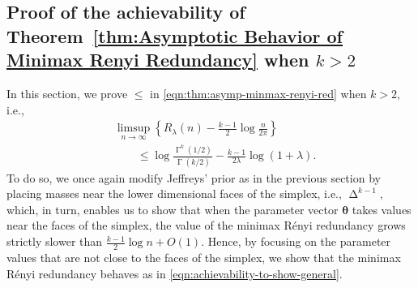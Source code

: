 \documentclass[journal, 10pt]{IEEEtran}
\theoremstyle{plain}
\theoremstyle{plain}
\theoremstyle{plain}
\theoremstyle{plain}
\newcommand{\boldtheta}{\mathbold{\theta}}
\newcommand{\opGamma}{\operatorname{\Gamma}}
\newcommand{\simplex}{\operatorname{\Delta}}
\begin{document}
\subsection{Proof of the achievability of Theorem~\ref{thm:Asymptotic Behavior of Minimax Renyi Redundancy} when $k>2$} \label{sec:subsec:ach-gen}
In this section, we prove $\le $ in \eqref{eqn:thm:asymp-minmax-renyi-red} when $k>2$, i.e.,
\begin{align}
&\limsup_{n\to \infty} \left\{ R_\lambda(n)  -\frac{k-1}{2}\log \frac{n}{2\pi} \right\} \nonumber \\ 
&\qquad \le \log \frac{\opGamma^k(1/2) }{\opGamma(k/2) }-\frac{k-1}{2\lambda} \log (1+\lambda) \text{.} \label{eqn:achievability-to-show-general}
\end{align}
To do so, we once again modify Jeffreys' prior as in the previous section by placing masses near the lower dimensional faces of the simplex, i.e., $\simplex^{k-1} $, which, in turn, enables us to show that when the parameter vector $\boldtheta$ takes values near the faces of the simplex, the value of the minimax R\'enyi redundancy grows strictly slower than $ \frac{k-1}{2} \log n +O(1) $. Hence, by focusing on the parameter values that are not close to the faces of the simplex, we show that the minimax R\'enyi redundancy behaves as in \eqref{eqn:achievability-to-show-general}.
\end{document}
